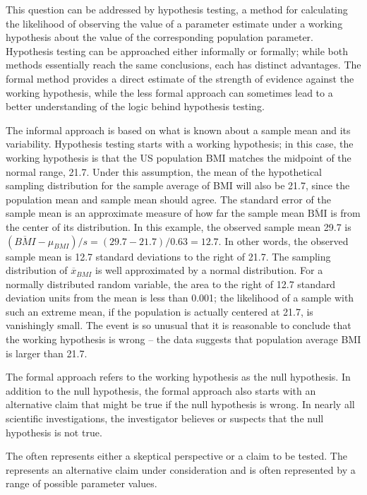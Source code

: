 \begin{spacing}{1.5}
This question can be addressed by hypothesis testing, a method for calculating the likelihood of observing the value of a parameter estimate under a working hypothesis about the value of the corresponding population parameter. Hypothesis testing can be approached either informally or formally; while both methods essentially reach the same conclusions, each has distinct advantages. The formal method provides a direct estimate of the strength of evidence against the working hypothesis, while the less formal approach can sometimes lead to a better understanding of the logic behind hypothesis testing.

The informal approach is based on what is known about a sample mean and its variability. Hypothesis testing starts with a working hypothesis; in this case, the working hypothesis is that the US population BMI matches the midpoint of the normal range, 21.7. Under this assumption, the mean of the hypothetical sampling distribution for the sample average of BMI will also be 21.7, since the population mean and sample mean should agree. The standard error of the sample mean is an approximate measure of how far the sample mean $\overline{\text{BMI}}$ is from the center of its distribution. In this example, the observed sample mean 29.7 is $(\overline{BMI} - \mu_{BMI})/s =  (29.7 - 21.7)/0.63 = 12.7$. In other words, the observed sample mean is 12.7 standard deviations to the right of 21.7. The sampling distribution of $\overline{x}_{BMI}$ is well approximated by a normal distribution. For a normally distributed random variable, the area to the right of 12.7 standard deviation units from the mean is less than 0.001; the likelihood of a sample with such an extreme mean, if the population is actually centered at 21.7, is vanishingly small. The event is so unusual that it is reasonable to conclude that the working hypothesis is wrong -- the data suggests that population average BMI is larger than 21.7.

The formal approach refers to the working hypothesis as the null hypothesis. In addition to the null hypothesis, the formal approach also starts with an alternative claim that might be true if the null hypothesis is wrong. In nearly all scientific investigations, the investigator believes or suspects that the null hypothesis is not true. 

\begin{termBox}{
{The  often represents either a skeptical perspective or a claim to be tested. The  represents an alternative claim under consideration and is often represented by a range of possible parameter values.}}
\end{termBox}


\end{spacing}
